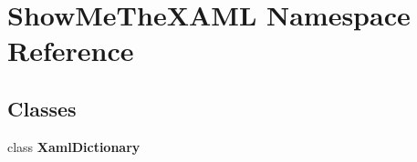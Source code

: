 \section{Show\+Me\+The\+X\+A\+ML Namespace Reference}
\label{namespace_show_me_the_x_a_m_l}
\subsection*{Classes}
\begin{DoxyCompactItemize}
\item 
class {\bfseries Xaml\+Dictionary}
\end{DoxyCompactItemize}
